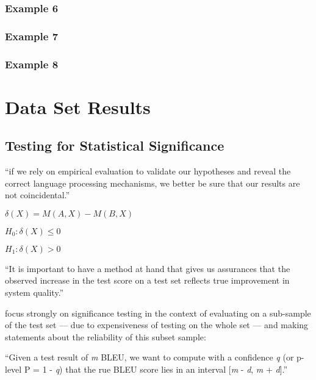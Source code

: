 
\subsubsection{Example 6}


\subsubsection{Example 7}


\subsubsection{Example 8}


\section{Data Set Results}

\subsection{Testing for Statistical Significance}

``if we rely on empirical evaluation to validate our hypotheses and reveal the correct language processing mechanisms, we better be sure that our results are not coincidental.'' \citep{dror2018hitchhiker}


$\delta(X) = M(A, X) - M(B, X)$

$H_0:\delta(X) \leq 0$

$H_1:\delta(X) > 0$


``It is important to have a method at hand that gives us assurances that the
observed increase in the test score on a test set reflects true improvement in system
quality.'' \citep{koehn2004statistical}

\citet{koehn2004statistical} focus strongly on significance testing in the context of evaluating
on a sub-sample of the test set --- due to expensiveness of testing on the whole set ---
and making statements about the reliability of this subset sample:

``Given a test result of \emph{m} BLEU, we want to compute with a confidence \emph{q} (or
p-level P = 1 - \emph{q}) that the rue BLEU score lies in an interval [\emph{m} - \emph{d},
\emph{m} + \emph{d}].'' \citep{koehn2004statistical}

